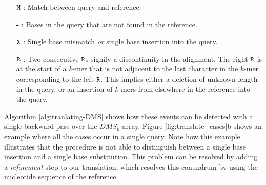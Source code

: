 \documentclass[unnumsec,webpdf,contemporary,large]{oup-authoring-template}%
\theoremstyle{thmstyleone}%
\theoremstyle{thmstyletwo}%
\theoremstyle{thmstylethree}%
\begin{document}
\begin{enumerate}
\item[\textbf{$\tt{M}$}]: Match between query and reference.
\item[\textbf{-}]: Bases in the query that are not found in the reference.
\item[\textbf{$\tt{X}$}]: Single base mismatch \textit{or} single base insertion into the query.
\item[\textbf{$\tt{R}$}]: Two consecutive ${\tt R}$s signify a discontinuity in the alignment. The right ${\tt R}$ is at the start of a $k$-mer that is not adjacent to the last character in the $k$-mer corresponding to the left ${\tt R}$. This implies either a deletion of unknown length in the query, or an insertion of $k$-mers from elsewhere in the reference into the query.
\end{enumerate}
Algorithm \ref{alg:tranlating-DMS} shows how these events can be detected with a single backward pass over the $DMS_k$ array. Figure \ref{fig:translate_cases}b shows an example where all the cases occur in a single query. Note how this example illustrates that the procedure is not able to distinguish between a single base insertion and a single base substitution. This problem can be resolved by adding a \textit{refinement} step to our translation, which resolves this conundrum by using the nucleotide sequence of the reference.

\end{document}
